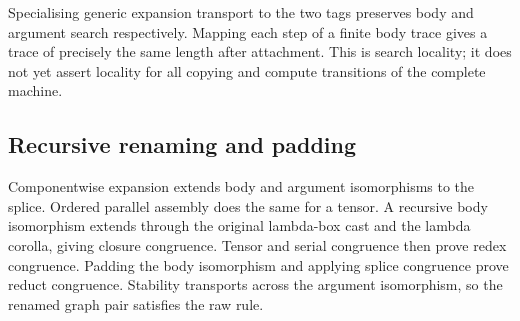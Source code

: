 





Specialising generic expansion transport to the two tags preserves
body and argument search respectively. Mapping each step of a finite body
trace gives a trace of precisely the same length after attachment. This is
search locality; it does not yet assert locality for all copying and compute
transitions of the complete machine.




\subsection{Recursive renaming and padding}

Componentwise expansion extends body and argument isomorphisms to the
splice. Ordered parallel assembly does the same for a tensor. A recursive
body isomorphism extends through the original lambda-box cast and the lambda
corolla, giving closure congruence. Tensor and serial congruence then prove
redex congruence. Padding the body isomorphism and applying splice congruence
prove reduct congruence. Stability transports across the argument isomorphism,
so the renamed graph pair satisfies the raw rule.





